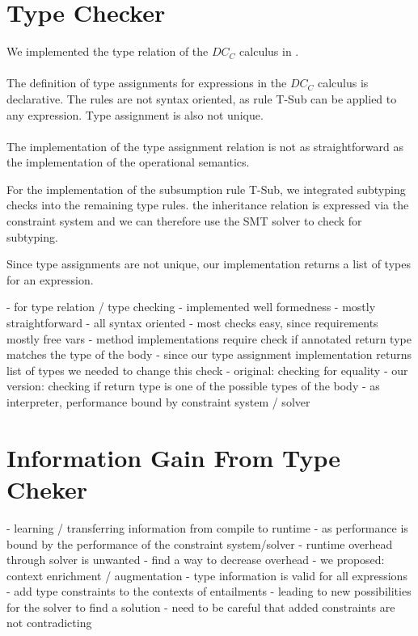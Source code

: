 \section{Type Checker}
We implemented the type relation of the $DC_C$ calculus
in .\\
\\
The definition of type assignments for expressions
in the $DC_C$ calculus is declarative.
The rules are not syntax oriented,
as rule T-Sub can be applied to any expression.
Type assignment is also not unique.\\
\\
The implementation of the type assignment relation
is not as straightforward as the implementation
of the operational semantics.

For the implementation of the subsumption rule T-Sub,
we integrated subtyping checks into the remaining type rules.
the inheritance relation is expressed via the constraint system
and we can therefore use the SMT solver to check for subtyping.

Since type assignments are not unique,
our implementation returns a list of types for
an expression.

- for type relation / type checking
  - implemented well formedness
    - mostly straightforward
    - all syntax oriented
    - most checks easy, since requirements mostly free vars
    - method implementations require check if annotated return type matches the type of the body
      - since our type assignment implementation returns list of types
        we needed to change this check
      - original: checking for equality
      - our version: checking if return type is one of the possible types of the body
  - as interpreter, performance bound by constraint system / solver

\section{Information Gain From Type Cheker}
- learning / transferring information from compile to runtime
  - as performance is bound by the performance of the constraint system/solver
  - runtime overhead through solver is unwanted
  - find a way to decrease overhead
  - we proposed: context enrichment / augmentation
  - type information is valid for all expressions
  - add type constraints to the contexts of entailments
  - leading to new possibilities for the solver to find a solution
  - need to be careful that added constraints are not contradicting

